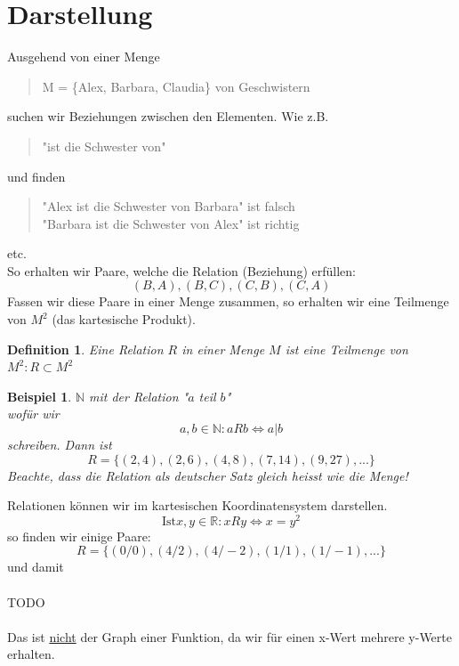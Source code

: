 \documentclass{report}
\newtheorem{mydef}{Definition}
\newtheorem{myexample}{Beispiel}
\begin{document}
\section{Darstellung}
Ausgehend von einer Menge
\begin{quote}M = \{Alex, Barbara, Claudia\} von Geschwistern\end{quote}
suchen wir Beziehungen zwischen den Elementen. Wie z.B.
\begin{quote}"ist die Schwester von"\end{quote}
und finden
\begin{quote}"Alex ist die Schwester von Barbara" ist falsch\\
"Barbara ist die Schwester von Alex" ist richtig\end{quote}
etc.\\
So erhalten wir Paare, welche die Relation (Beziehung) erfüllen:
\begin{equation}(B,A),(B,C),(C,B),(C,A)\end{equation}
Fassen wir diese Paare in einer Menge zusammen, so erhalten wir eine Teilmenge von $M^2$ (das kartesische Produkt).
\begin{mydef}Eine Relation $R$ in einer Menge $M$ ist eine Teilmenge von $M^2: R \subset M^2$\end{mydef}
\begin{myexample}$\mathbb{N}$ mit der Relation "$a$ teil $b$"\\
wofür wir
\begin{equation}a,b \in \mathbb{N}: a R b \iff a | b\end{equation}
schreiben. Dann ist
\begin{equation}R = \{(2,4),(2,6),(4,8),(7,14),(9,27),...\}\end{equation}
Beachte, dass die Relation als deutscher Satz gleich heisst wie die Menge!\end{myexample}
Relationen können wir im kartesischen Koordinatensystem darstellen.
\begin{equation}\mbox{Ist} x,y \in \mathbb{R}: x R y \iff x = y^2\end{equation}
so finden wir einige Paare:
\begin{equation}R= \{(0/0),(4/2),(4/-2),(1/1),(1/-1),...\}\end{equation}
und damit
\\\\TODO\\\\
Das ist \underline{nicht} der Graph einer Funktion, da wir für einen x-Wert mehrere y-Werte erhalten.
\end{document}
